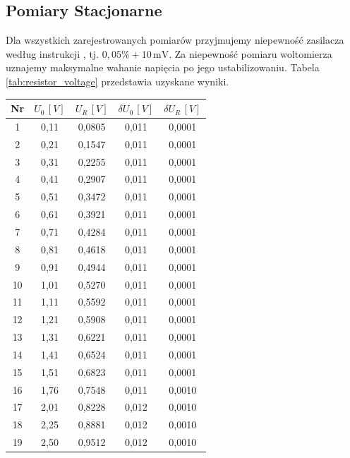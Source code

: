 \documentclass[12pt]{article}
\begin{document}
\subsection{Pomiary Stacjonarne}
Dla wszystkich zarejestrowanych pomiarów przyjmujemy niepewność zasilacza według instrukcji \cite{generator}, tj. $0{,}05\% + 10\,\mathrm{mV}$.  
Za niepewność pomiaru woltomierza uznajemy maksymalne wahanie napięcia po jego ustabilizowaniu. Tabela \ref{tab:resistor_voltage} przedstawia uzyskane wyniki.
\begin{table}[H]
    \centering
    \begin{tabular}{c|cccc}
        \toprule
        Nr & $U_0 \,[V]$ & $U_R \,[V]$ & $\delta U_0 \,[V]$ & $\delta U_R \,[V]$ \\
        \midrule
        1  & 0{,}11  & 0{,}0805 & 0{,}011 & 0{,}0001  \\
        2  & 0{,}21  & 0{,}1547 & 0{,}011 & 0{,}0001  \\
        3  & 0{,}31  & 0{,}2255 & 0{,}011 & 0{,}0001  \\
        4  & 0{,}41  & 0{,}2907 & 0{,}011 & 0{,}0001  \\
        5  & 0{,}51  & 0{,}3472 & 0{,}011 & 0{,}0001  \\
        6  & 0{,}61  & 0{,}3921 & 0{,}011 & 0{,}0001  \\
        7  & 0{,}71  & 0{,}4284 & 0{,}011 & 0{,}0001  \\
        8  & 0{,}81  & 0{,}4618 & 0{,}011 & 0{,}0001  \\
        9  & 0{,}91  & 0{,}4944 & 0{,}011 & 0{,}0001  \\
        10 & 1{,}01  & 0{,}5270 & 0{,}011 & 0{,}0001  \\
        11 & 1{,}11  & 0{,}5592 & 0{,}011 & 0{,}0001  \\
        12 & 1{,}21  & 0{,}5908 & 0{,}011 & 0{,}0001  \\
        13 & 1{,}31  & 0{,}6221 & 0{,}011 & 0{,}0001  \\
        14 & 1{,}41  & 0{,}6524 & 0{,}011 & 0{,}0001  \\
        15 & 1{,}51  & 0{,}6823 & 0{,}011 & 0{,}0001  \\
        16 & 1{,}76  & 0{,}7548 & 0{,}011 & 0{,}0010  \\
        17 & 2{,}01  & 0{,}8228 & 0{,}012 & 0{,}0010  \\
        18 & 2{,}25  & 0{,}8881 & 0{,}012 & 0{,}0010  \\
        19 & 2{,}50  & 0{,}9512 & 0{,}012 & 0{,}0010  \\

\end{tabular}
\end{table}
\end{document}
